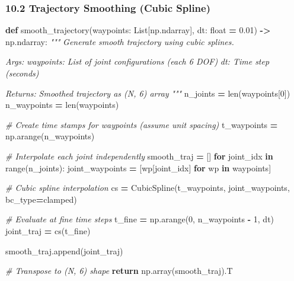 \documentclass[
]{article}
\newenvironment{Shaded}{\begin{snugshade}}{\end{snugshade}}
\newcommand{\BuiltInTok}[1]{#1}
\newcommand{\CommentTok}[1]{\textcolor[rgb]{0.56,0.35,0.01}{\textit{#1}}}
\newcommand{\ControlFlowTok}[1]{\textcolor[rgb]{0.13,0.29,0.53}{\textbf{#1}}}
\newcommand{\DecValTok}[1]{\textcolor[rgb]{0.00,0.00,0.81}{#1}}
\newcommand{\FloatTok}[1]{\textcolor[rgb]{0.00,0.00,0.81}{#1}}
\newcommand{\KeywordTok}[1]{\textcolor[rgb]{0.13,0.29,0.53}{\textbf{#1}}}
\newcommand{\NormalTok}[1]{#1}
\newcommand{\OperatorTok}[1]{\textcolor[rgb]{0.81,0.36,0.00}{\textbf{#1}}}
\newcommand{\StringTok}[1]{\textcolor[rgb]{0.31,0.60,0.02}{#1}}
\begin{document}
\hypertarget{trajectory-smoothing-cubic-spline}{%
\subsubsection{10.2 Trajectory Smoothing (Cubic
Spline)}\label{trajectory-smoothing-cubic-spline}}

\begin{Shaded}
\begin{Highlighting}[]
\KeywordTok{def}\NormalTok{ smooth\_trajectory(waypoints: List[np.ndarray], dt: }\BuiltInTok{float} \OperatorTok{=} \FloatTok{0.01}\NormalTok{) }\OperatorTok{{-}\textgreater{}}\NormalTok{ np.ndarray:}
    \CommentTok{"""}
\CommentTok{    Generate smooth trajectory using cubic splines.}

\CommentTok{    Args:}
\CommentTok{        waypoints: List of joint configurations (each 6 DOF)}
\CommentTok{        dt: Time step (seconds)}

\CommentTok{    Returns:}
\CommentTok{        Smoothed trajectory as (N, 6) array}
\CommentTok{    """}
\NormalTok{    n\_joints }\OperatorTok{=} \BuiltInTok{len}\NormalTok{(waypoints[}\DecValTok{0}\NormalTok{])}
\NormalTok{    n\_waypoints }\OperatorTok{=} \BuiltInTok{len}\NormalTok{(waypoints)}

    \CommentTok{\# Create time stamps for waypoints (assume unit spacing)}
\NormalTok{    t\_waypoints }\OperatorTok{=}\NormalTok{ np.arange(n\_waypoints)}

    \CommentTok{\# Interpolate each joint independently}
\NormalTok{    smooth\_traj }\OperatorTok{=}\NormalTok{ []}
    \ControlFlowTok{for}\NormalTok{ joint\_idx }\KeywordTok{in} \BuiltInTok{range}\NormalTok{(n\_joints):}
\NormalTok{        joint\_waypoints }\OperatorTok{=}\NormalTok{ [wp[joint\_idx] }\ControlFlowTok{for}\NormalTok{ wp }\KeywordTok{in}\NormalTok{ waypoints]}

        \CommentTok{\# Cubic spline interpolation}
\NormalTok{        cs }\OperatorTok{=}\NormalTok{ CubicSpline(t\_waypoints, joint\_waypoints, bc\_type}\OperatorTok{=}\StringTok{\textquotesingle{}clamped\textquotesingle{}}\NormalTok{)}

        \CommentTok{\# Evaluate at fine time steps}
\NormalTok{        t\_fine }\OperatorTok{=}\NormalTok{ np.arange(}\DecValTok{0}\NormalTok{, n\_waypoints }\OperatorTok{{-}} \DecValTok{1}\NormalTok{, dt)}
\NormalTok{        joint\_traj }\OperatorTok{=}\NormalTok{ cs(t\_fine)}

\NormalTok{        smooth\_traj.append(joint\_traj)}

    \CommentTok{\# Transpose to (N, 6) shape}
    \ControlFlowTok{return}\NormalTok{ np.array(smooth\_traj).T}
\end{Highlighting}
\end{Shaded}
\end{document}
